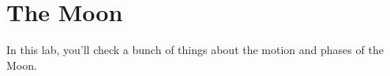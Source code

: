\section{The Moon}

\makelabheader

\bigskip

In this lab, you'll check a bunch 
of things about the motion and phases of the Moon.












